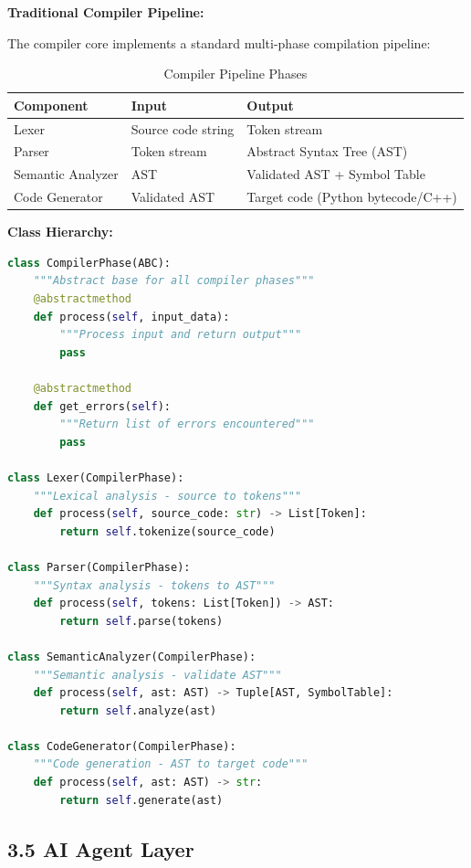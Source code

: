 \documentclass[a4paper,11pt]{article}
\begin{document}
\textbf{Traditional Compiler Pipeline:}

The compiler core implements a standard multi-phase compilation pipeline:

\begin{table}[h]
\centering
\begin{tabularx}{\textwidth}{|l|X|X|}
\hline
\rowcolor{blue!10}
\textbf{Component} & \textbf{Input} & \textbf{Output} \\
\hline
Lexer & Source code string & Token stream \\
\hline
Parser & Token stream & Abstract Syntax Tree (AST) \\
\hline
Semantic Analyzer & AST & Validated AST + Symbol Table \\
\hline
Code Generator & Validated AST & Target code (Python bytecode/C++) \\
\hline
\end{tabularx}
\caption{Compiler Pipeline Phases}
\end{table}

\textbf{Class Hierarchy:}

\begin{lstlisting}[language=Python, caption=Compiler Component Interfaces]
class CompilerPhase(ABC):
    """Abstract base for all compiler phases"""
    @abstractmethod
    def process(self, input_data):
        """Process input and return output"""
        pass
    
    @abstractmethod
    def get_errors(self):
        """Return list of errors encountered"""
        pass

class Lexer(CompilerPhase):
    """Lexical analysis - source to tokens"""
    def process(self, source_code: str) -> List[Token]:
        return self.tokenize(source_code)

class Parser(CompilerPhase):
    """Syntax analysis - tokens to AST"""
    def process(self, tokens: List[Token]) -> AST:
        return self.parse(tokens)

class SemanticAnalyzer(CompilerPhase):
    """Semantic analysis - validate AST"""
    def process(self, ast: AST) -> Tuple[AST, SymbolTable]:
        return self.analyze(ast)

class CodeGenerator(CompilerPhase):
    """Code generation - AST to target code"""
    def process(self, ast: AST) -> str:
        return self.generate(ast)
\end{lstlisting}

\subsection{3.5 AI Agent Layer}
\end{document}
